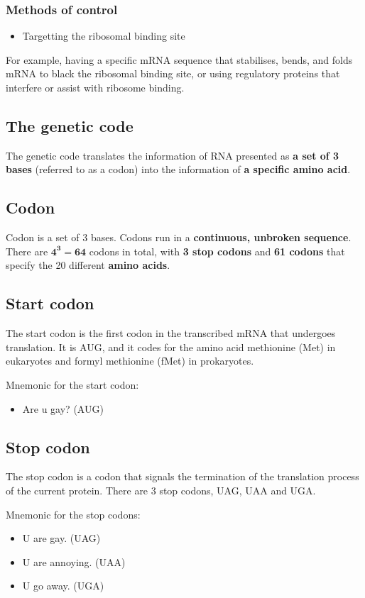 \documentclass[11pt]{article}
\begin{document}
\subsubsection{Methods of control}
\label{sec:orgf2fc589}
\begin{itemize}
\item Targetting the ribosomal binding site
\end{itemize}

For example, having a specific mRNA sequence that stabilises, bends, and folds mRNA to black the ribosomal binding site, or using regulatory proteins that interfere or assist with ribosome binding.
\subsection{The genetic code}
\label{sec:org8bc67ce}
The genetic code translates the information of RNA presented as \textbf{a set of 3 bases} (referred to as a codon) into the information of \textbf{a specific amino acid}.
\subsection{Codon}
\label{sec:org4c8f997}
Codon is a set of 3 bases. Codons run in a \textbf{continuous, unbroken sequence}. There are \(\boldsymbol{4^3 = 64}\) codons in total, with \textbf{3 stop codons} and \textbf{61 codons} that specify the 20 different \textbf{amino acids}.
\subsection{Start codon}
\label{sec:org0f80542}
The start codon is the first codon in the transcribed mRNA that undergoes translation. It is AUG, and it codes for the amino acid methionine (Met) in eukaryotes and formyl methionine (fMet) in prokaryotes.


Mnemonic for the start codon:
\begin{itemize}
\item Are u gay? (AUG)
\end{itemize}
\subsection{Stop codon}
\label{sec:orgc10ce97}
The stop codon is a codon that signals the termination of the translation process of the current protein. There are 3 stop codons, UAG, UAA and UGA.


Mnemonic for the stop codons:
\begin{itemize}
\item U are gay. (UAG)
\item U are annoying. (UAA)
\item U go away. (UGA)
\end{itemize}
\end{document}
